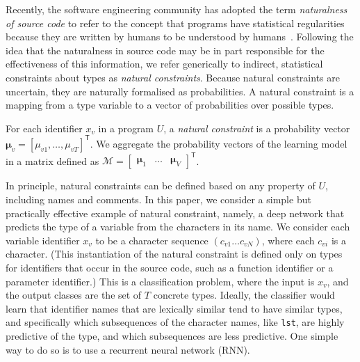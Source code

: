 \documentclass[acmsmall,nonacm]{acmart}\settopmatter{printfolios=true,printccs=false,printacmref=false}
\begin{document}
Recently, the software engineering
community has adopted the term \emph{naturalness of source code} to refer to
the concept that programs have statistical regularities because
they are written by humans to be
understood by humans~\citep{hindle12}.
Following the idea that the naturalness in source code may be in part responsible
for the effectiveness of this information, we
refer generically to indirect, statistical
constraints about types as \emph{natural constraints}.
Because natural constraints are uncertain, they are naturally formalised
as probabilities.
A natural constraint is a mapping from a type variable to a vector
of probabilities
over possible types.
\begin{definition}\label{eq:natural}
	For each identifier $x_v$ in a program $U$,
	a \emph{natural constraint} is a probability vector $\bm{\mu}_v = [\mu_{v1}, \ldots, \mu_{vT}]^\mathsf{T}$.
	We aggregate the probability vectors of the learning model in a matrix
	defined as $\mathcal{M} = \begin{bmatrix} \bm{\mu}_1 & \ldots & \bm{\mu}_{V} \end{bmatrix}^\mathsf{T}$.
\end{definition}

In principle, natural constraints can be defined based on any property of $U$,
including names and comments.
In this paper, we consider a simple but practically effective example of
natural constraint, namely, a deep network that predicts the type
of a variable from the characters in its name.
We consider each variable identifier $x_v$ to be a character sequence $(c_{v1} \ldots c_{vN})$,
where each $c_{vi}$ is a character.
(This instantiation of the natural constraint is defined
only on types for identifiers that occur in the source code,
such as a function identifier or a parameter identifier.)
This is a classification problem, where the input is $x_v$,
and the output classes are the set of $T$ concrete types.
Ideally, the classifier would learn that identifier names that are lexically similar
tend to have similar types, and specifically which subsequences of the character names,
like \texttt{\small{lst}}, are highly predictive of the type, and which subsequences are less predictive.
One simple way to do so is to use a recurrent neural network (RNN).
\end{document}
